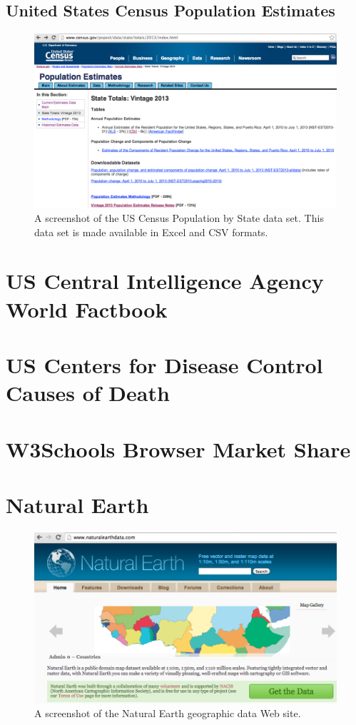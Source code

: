 \subsection{United States Census Population Estimates}
\begin{figure}[h]
  \caption{A screenshot of the US Census Population by State data set. This data set is made available in Excel and CSV formats.}
  \centering
  \includegraphics[width=\textwidth]{figures/usCensusPopulationByState.png}
\end{figure}
\section{US Central Intelligence Agency World Factbook}
\section{US Centers for Disease Control Causes of Death}
\section{W3Schools Browser Market Share}
\section{Natural Earth}
\begin{figure}[h]
  \caption{A screenshot of the Natural Earth geographic data Web site.}
  \centering
  \includegraphics[width=\textwidth]{figures/naturalEarth.png}
\end{figure}
